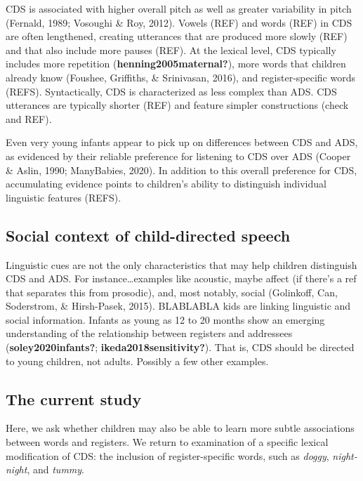 \documentclass[10pt, letterpaper]{article}
\begin{document}
CDS is associated with higher overall pitch as well as greater
variability in pitch (Fernald, 1989; Vosoughi \& Roy, 2012). Vowels
(REF) and words (REF) in CDS are often lengthened, creating utterances
that are produced more slowly (REF) and that also include more pauses
(REF). At the lexical level, CDS typically includes more repetition
(\textbf{henning2005maternal?}), more words that children already know
(Foushee, Griffiths, \& Srinivasan, 2016), and register-specific words
(REFS). Syntactically, CDS is characterized as less complex than ADS.
CDS utterances are typically shorter (REF) and feature simpler
constructions (check and REF).

Even very young infants appear to pick up on differences between CDS and
ADS, as evidenced by their reliable preference for listening to CDS over
ADS (Cooper \& Aslin, 1990; ManyBabies, 2020). In addition to this
overall preference for CDS, accumulating evidence points to children's
ability to distinguish individual linguistic features (REFS).

\hypertarget{social-context-of-child-directed-speech}{%
\subsection{Social context of child-directed
speech}\label{social-context-of-child-directed-speech}}

Linguistic cues are not the only characteristics that may help children
distinguish CDS and ADS. For instance\ldots examples like acoustic,
maybe affect (if there's a ref that separates this from prosodic), and,
most notably, social (Golinkoff, Can, Soderstrom, \& Hirsh-Pasek, 2015).
BLABLABLA kids are linking linguistic and social information. Infants as
young as 12 to 20 months show an emerging understanding of the
relationship between registers and addressees
(\textbf{soley2020infants?}; \textbf{ikeda2018sensitivity?}). That is,
CDS should be directed to young children, not adults. Possibly a few
other examples.

\hypertarget{the-current-study}{%
\subsection{The current study}\label{the-current-study}}

Here, we ask whether children may also be able to learn more subtle
associations between words and registers. We return to examination of a
specific lexical modification of CDS: the inclusion of register-specific
words, such as \emph{doggy}, \emph{night-night}, and \emph{tummy}.
\end{document}
